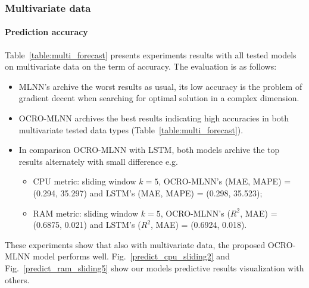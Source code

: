 \documentclass[review,3p,authoryear]{elsarticle}
\begin{document}
{\subsubsection{Multivariate data}

\paragraph{\textbf{Prediction accuracy}} 
Table~\ref{table:multi_forecast} presents experiments results with all tested models on multivariate data on the term of accuracy. The evaluation is as follows:
\begin{itemize}

\item MLNN's archive the worst results as usual, its low accuracy is the problem of gradient decent when searching for optimal solution in a complex dimension. 

\item OCRO-MLNN archives the best results indicating high accuracies in both multivariate tested data types (Table~\ref{table:multi_forecast}).

\item In comparison OCRO-MLNN with LSTM, both models archive the top results alternately with small difference e.g. 
	\begin{itemize}
	\item CPU metric: sliding window $k = 5$, OCRO-MLNN's (MAE, MAPE) = (0.294, 35.297) and LSTM's (MAE, MAPE) = (0.298, 35.523);
	\item RAM metric: sliding window $k = 5$, OCRO-MLNN's ($R^2$, MAE) = (0.6875, 0.021) and LSTM's ($R^2$, MAE) = (0.6924, 0.018).
	\end{itemize}
\end{itemize}

These experiments show that also with multivariate data, the proposed OCRO-MLNN model performs well. Fig.~\ref{predict_cpu_sliding2} and Fig.~\ref{predict_ram_sliding5} show our models predictive results visualization with others.

}
\end{document}
